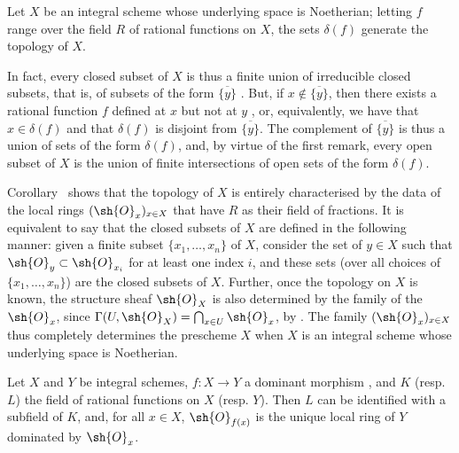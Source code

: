 \begin{corollary}[8.2.5]
\label{I.8.2.5}
Let $X$ be an integral scheme whose underlying space is Noetherian;
letting $f$ range over the field $R$ of rational functions on $X$, the sets $\delta(f)$ generate the topology of $X$.
\end{corollary}

In fact, every closed subset of $X$ is thus a finite union of irreducible closed subsets, that is, of subsets of the form $\overline{\{y\}}$ .
But, if $x\not\in\overline{\{y\}}$, then there exists a rational function $f$ defined at $x$ but not at $y$ , or, equivalently, we have that $x\in\delta(f)$ and that $\delta(f)$ is disjoint from $\overline{\{y\}}$.
The complement of $\overline{\{y\}}$ is thus a union of sets of the form $\delta(f)$, and, by virtue of the first remark, every open subset of $X$ is the union of finite intersections of open sets of the form $\delta(f)$.

\begin{env}[8.2.6]
\label{I.8.2.6}
Corollary~ shows that the topology of $X$ is entirely characterised by the data of the local rings $(\sh{O}_x)_{x\in X}$ that have $R$ as their field of fractions.
It is equivalent to say that the closed subsets of $X$ are defined in the following manner: given a finite subset $\{x_1,\ldots,x_n\}$ of $X$, consider the set of $y\in X$ such that $\sh{O}_y\subset\sh{O}_{x_i}$ for at least one index $i$, and these sets (over all choices of $\{x_1,\ldots,x_n\}$) are the closed subsets of $X$.
Further, once the topology on $X$ is known, the structure sheaf $\sh{O}_X$ is also determined by the family of the $\sh{O}_x$, since $\Gamma(U,\sh{O}_X)=\bigcap_{x\in U}\sh{O}_x$, by .
The family $(\sh{O}_x)_{x\in X}$ thus completely determines the prescheme $X$ when $X$ is an integral scheme whose underlying space is Noetherian.
\end{env}

\begin{proposition}[8.2.7]
\label{I.8.2.7}
Let $X$ and $Y$ be integral schemes, $f:X\to Y$ a dominant morphism , and $K$ (resp. $L$) the field of rational functions on $X$ (resp. $Y$).
Then $L$ can be identified with a subfield of $K$, and, for all $x\in X$, $\sh{O}_{f(x)}$ is the unique local ring of $Y$ dominated by $\sh{O}_x$.
\end{proposition}

